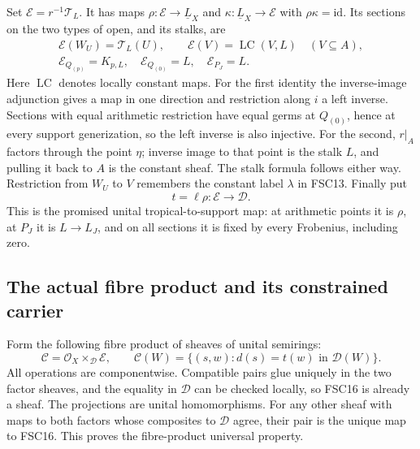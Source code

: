 Set $\mathcal E=r^{-1}\mathcal T_L$. It has maps
$\rho:\mathcal E\to\underline L_X$ and
$\kappa:\underline L_X\to\mathcal E$ with $\rho\kappa=\mathrm{id}$.
Its sections on the two types of open, and its stalks, are
\begin{equation}\tag{FSC14}
 \begin{gathered}
 \mathcal E(W_U)=\mathcal T_L(U),\qquad
 \mathcal E(V)=\operatorname{LC}(V,L)\quad(V\subseteq A),\\
 \mathcal E_{Q_{(p)}}=K_{p,L},\quad
 \mathcal E_{Q_{(0)}}=L,\quad\mathcal E_{P_J}=L.
 \end{gathered}
\end{equation}
Here $\operatorname{LC}$ denotes locally constant maps. For the first
identity the inverse-image adjunction gives a map in one direction
and restriction along $i$ a left inverse. Sections with equal
arithmetic restriction have equal germs at $Q_{(0)}$, hence at every
support generization, so the left inverse is also injective. For the
second, $r|_A$ factors through the point $\eta$; inverse image to that
point is the stalk $L$, and pulling it back to $A$ is the constant
sheaf. The stalk formula follows either way. Restriction from $W_U$
to $V$ remembers the constant label $\lambda$ in FSC13. Finally put
\begin{equation}\tag{FSC15}
 t=\ell\rho:\mathcal E\longrightarrow\mathcal D.
\end{equation}
This is the promised unital tropical-to-support map: at arithmetic
points it is $\rho$, at $P_J$ it is $L\to L_J$, and on all sections
it is fixed by every Frobenius, including zero.


\subsection{The actual fibre product and its constrained carrier}
Form the following fibre product of sheaves of unital semirings:
\begin{equation}\tag{FSC16}
 \mathcal C=\mathcal O_X\mathbin{\times}_{\mathcal D}\mathcal E,
 \qquad
 \mathcal C(W)=\{(s,w):d(s)=t(w)\text{ in }\mathcal D(W)\}.
\end{equation}
All operations are componentwise. Compatible pairs glue uniquely in
the two factor sheaves, and the equality in $\mathcal D$ can be
checked locally, so FSC16 is already a sheaf. The projections are
unital homomorphisms. For any other sheaf with maps to both factors
whose composites to $\mathcal D$ agree, their pair is the unique
map to FSC16. This proves the fibre-product universal property.

